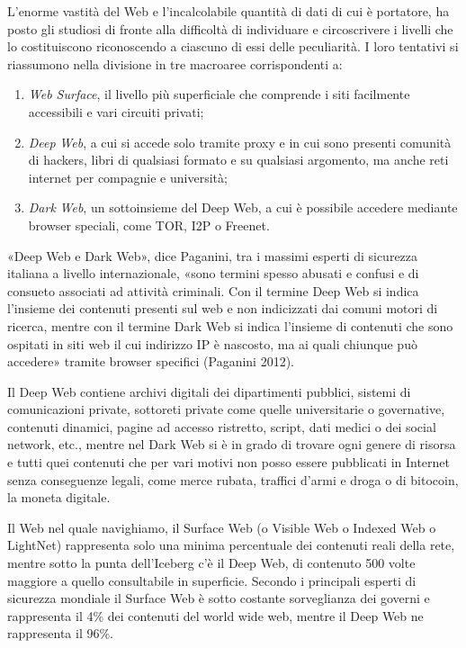 {{L'enorme vastità del Web e l'incalcolabile quantità di dati di cui è
portatore, ha posto gli studiosi di fronte alla difficoltà di
individuare e circoscrivere i livelli che lo costituiscono riconoscendo
a ciascuno di essi delle peculiarità. I loro tentativi si riassumono
nella divisione in tre macroaree corrispondenti a:

\begin{enumerate}
\def\labelenumi{\arabic{enumi}.}
\item
  \emph{Web Surface}, il livello più superficiale che comprende i siti
  facilmente accessibili e vari circuiti privati;
\item
  \emph{Deep} \emph{Web}, a cui si accede solo tramite proxy e in cui
  sono presenti comunità di hackers, libri di qualsiasi formato e su
  qualsiasi argomento, ma anche reti internet per compagnie e
  università;
\item
  \emph{Dark} \emph{Web}, un sottoinsieme del Deep Web, a cui è
  possibile accedere mediante browser speciali, come TOR, I2P o Freenet.
\end{enumerate}

«Deep Web e Dark Web», dice Paganini, tra i massimi esperti di sicurezza
italiana a livello internazionale, «sono termini spesso abusati e
confusi e di consueto associati ad attività criminali. Con il termine
Deep Web si indica l'insieme dei contenuti presenti sul web e non
indicizzati dai comuni motori di ricerca, mentre con il termine Dark Web
si indica l'insieme di contenuti che sono ospitati in siti web il cui
indirizzo IP è nascosto, ma ai quali chiunque può accedere» tramite
browser specifici (Paganini 2012).

Il Deep Web contiene archivi digitali dei dipartimenti pubblici, sistemi
di comunicazioni private, sottoreti private come quelle universitarie o
governative, contenuti dinamici, pagine ad accesso ristretto, script,
dati medici o dei social network, etc., mentre nel Dark Web si è in
grado di trovare ogni genere di risorsa e tutti quei contenuti che per
vari motivi non posso essere pubblicati in Internet senza conseguenze
legali, come merce rubata, traffici d'armi e droga o di bitocoin, la
moneta digitale.

Il Web nel quale navighiamo, il Surface Web (o Visible Web o Indexed Web
o LightNet) rappresenta solo una minima percentuale dei contenuti reali
della rete, mentre sotto la punta dell'Iceberg c'è il Deep Web, di
contenuto 500 volte maggiore a quello consultabile in superficie.
Secondo i principali esperti di sicurezza mondiale il Surface Web è
sotto costante sorveglianza dei governi e rappresenta il 4\% dei
contenuti del world wide web, mentre il Deep Web ne rappresenta il 96\%.

}}
